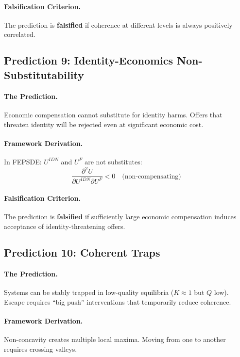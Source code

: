 \documentclass[12pt,a4paper]{article}
\begin{document}
\paragraph{Falsification Criterion.}
The prediction is \textbf{falsified} if coherence at different levels is always positively correlated.

\subsection{Prediction 9: Identity-Economics Non-Substitutability}

\paragraph{The Prediction.}
Economic compensation cannot substitute for identity harms. Offers that threaten identity will be rejected even at significant economic cost.

\paragraph{Framework Derivation.}
In FEPSDE: $U^{IDN}$ and $U^F$ are not substitutes:
\begin{equation}
    \frac{\partial^2 U}{\partial U^{IDN} \partial U^F} < 0 \quad \text{(non-compensating)}
\end{equation}

\paragraph{Falsification Criterion.}
The prediction is \textbf{falsified} if sufficiently large economic compensation induces acceptance of identity-threatening offers.

\subsection{Prediction 10: Coherent Traps}

\paragraph{The Prediction.}
Systems can be stably trapped in low-quality equilibria ($K \approx 1$ but $Q$ low). Escape requires ``big push'' interventions that temporarily reduce coherence.

\paragraph{Framework Derivation.}
Non-concavity creates multiple local maxima. Moving from one to another requires crossing valleys.
\end{document}
